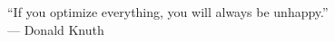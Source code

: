 \begin{epigraph}
\begin{center}
\vspace{-0.25in}
``If you optimize everything, you will always be unhappy.''\\
--- Donald Knuth
\end{center}
\end{epigraph}